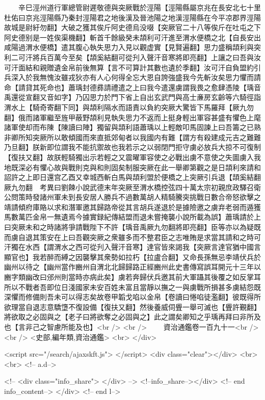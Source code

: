 　　辛巳涇州道行軍總管尉遲敬德與突厥戰於涇陽【涇陽縣屬京兆在長安北七十里杜佑曰京兆涇陽縣乃秦封涇陽君之地後漢及晉池陽之地漢涇陽縣在今平凉郡界涇陽故城是尉紆勿翻】大破之獲其俟斤阿史德烏没啜【突厥官二十八等俟斤在吐屯之下阿史德别是一姓俟渠機翻】斬首千餘級癸未頡利可汗進至渭水便橋之北【自長安出咸陽過渭水便橋】遣其腹心執失思力入見以觀虚實【見賢遍翻】思力盛稱頡利與突利二可汗將兵百萬今至矣【頡奚結翻可從刋入聲汗音寒將即亮翻】上讓之曰吾與汝可汗面結和親贈遺金帛前後無算【言不可算計其數也遺於季翻】汝可汗自負盟約引兵深入於我無愧汝雖戎狄亦有人心何得全忘大恩自誇強盛我今先斬汝矣思力懼而請命【請貸其死命也】蕭瑀封德彞請禮遣之上曰我今遣還虜謂我畏之愈肆憑陵【瑀音禹還從宣翻又音如字】乃囚思力於門下省上自出玄武門與高士亷房玄齡等六騎徑詣渭水上【騎奇寄翻下同】與頡利隔水而語責以負約突厥大驚皆下馬羅拜【厥九勿翻】俄而諸軍繼至旌甲蔽野頡利見執失思力不返而上挺身輕出軍容甚盛有懼色上麾諸軍使却而布陳【陳讀曰陣】獨留與頡利語蕭瑀以上輕敵叩馬固諫上曰吾籌之已熟非卿所知突厥所以敢傾國而來直抵郊甸者以我國内有難【謂方有殺建成元吉之難難乃旦翻】朕新即位謂我不能抗禦故也我若示之以弱閉門拒守虜必放兵大掠不可復制【復扶又翻】故朕輕騎獨出示若輕之又震曜軍容使之必戰出虜不意使之失圖虜入我地既深必有懼心故與戰則克與和則固矣制服突厥在此一舉卿第觀之是日頡利來請和詔許之上即日還宫乙酉又幸城西斬白馬與頡利盟於便橋之上突厥引兵退【頡奚結翻厥九勿翻　考異曰劉餗小說武德末年突厥至渭水橋控弦四十萬太宗初親庶政驛召衛公問策時發諸州軍未到長安居人勝兵不過數萬胡人精騎騰突挑戰日數合帝怒欲擊之靖請傾府庫賂以求和潛軍邀其歸路帝從其言胡兵遂退於是據險邀之虜弃老弱而遁獲馬數萬匹金帛一無遺焉今據實録紀傳結盟而退未嘗掩襲小說所載為誤】蕭瑀請於上曰突厥未和之時諸將爭請戰陛下不許【瑀音禹厥九勿翻將即亮翻】臣等亦以為疑既而虜自退其策安在上曰吾觀突厥之衆雖多而不整君臣之志唯賄是求當其請和之時可汗獨在水西【謂渭水之西可從刋入聲汗音寒】達官皆來謁我【突厥言達官猶中國言顯官也】我若醉而縛之因襲擊其衆勢如拉朽【拉盧合翻】又命長孫無忌李靖伏兵於幽州以待之【幽州當作豳州自渭北北歸歸路正經豳州此史書傳寫誤耳開元十三年以豳字類幽改曰邠州則當時亦病此矣】虜若奔歸伏兵邀其前大軍躡其後覆之如反掌耳所以不戰者吾即位日淺國家未安百姓未富且當靜以撫之一與虜戰所損甚多虜結怨既深懼而修備則吾未可以得志矣故卷甲韜戈啗以金帛【卷讀曰惓啗徒濫翻】彼既得所欲理當自退志意驕墯不復設備【復扶又翻】然後養威伺舋一舉可滅也【舋許覲翻】將欲取之必固與之【老子曰將欲奪之必固與之】此之謂矣卿知之乎瑀再拜曰非所及也【言非己之智慮所能及也】<br />
<br />
　　資治通鑑卷一百九十一<br />
<br />
<史部,編年類,資治通鑑>  <br>
   </div> 

<script src="/search/ajaxskft.js"> </script>
 <div class="clear"></div>
<br>
<br>
 <!-- a.d-->

 <!--
<div class="info_share">
</div> 
-->
 <!--info_share--></div>   <!-- end info_content-->
  </div> <!-- end l-->

